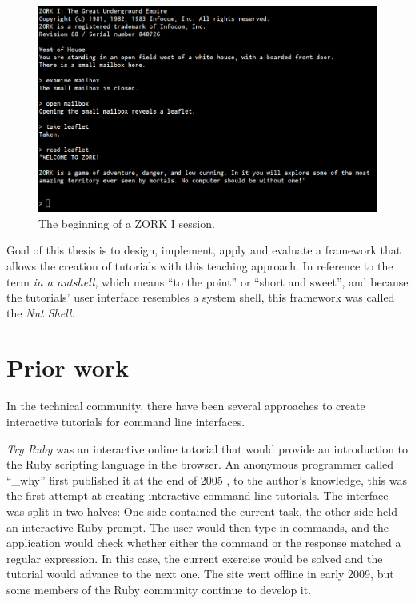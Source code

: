 \documentclass[paper=a4,twoside,abstract=on,cleardoublepage=empty,numbers=noenddot,toc=bib,12pt,appendixprefix=true]{scrreprt}
\begin{document}
\begin{figure}[tb]
    \includegraphics[width=\textwidth]{zork1.png}
    \centering
    \caption{The beginning of a ZORK I session.}
    \label{fig:zork}
\end{figure}

Goal of this thesis is to design, implement, apply and evaluate a framework that allows the creation of tutorials with this teaching approach. In reference to the term \emph{in a nutshell}, which means “to the point” or “short and sweet”, and because the tutorials' user interface resembles a system shell, this framework was called the \emph{Nut Shell}.

\section{Prior work}

In the technical community, there have been several approaches to create interactive tutorials for command line interfaces.

\emph{Try Ruby} was an interactive online tutorial that would provide an introduction to the Ruby scripting language in the browser. An anonymous programmer called “\_why” first published it at the end of 2005 \cite{why05}, to the author's knowledge, this was the first attempt at creating interactive command line tutorials. The interface was split in two halves: One side contained the current task, the other side held an interactive Ruby prompt. The user would then type in commands, and the application would check whether either the command or the response matched a regular expression. In this case, the current exercise would be solved and the tutorial would advance to the next one.
The site went offline in early 2009, but some members of the Ruby community continue to develop it.
\end{document}
